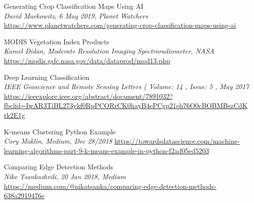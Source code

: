 \documentclass[12pt, openany]{report}
\begin{document}
\begin{thebibliography}{9}
Generating Crop Classification Maps Using AI\\
\textit{David Markowitz, 6 May 2019, Planet Watchers}\\
\url{https://www.planetwatchers.com/generating-crop-classification-maps-using-ai}

MODIS Vegetation Index Products\\
\textit{Kamel Didan, Moderate Resolution Imaging Spectroradiometer, NASA}\\
\url{https://modis.gsfc.nasa.gov/data/dataprod/mod13.php}

Deep Learning Classification\\
\textit{ IEEE Geoscience and Remote Sensing Letters ( Volume: 14 , Issue: 5 , May 2017 }\\
\url{https://ieeexplore.ieee.org/abstract/document/7891032?fbclid=IwAR3TiBL273ykf0RpPCORrCK0hayB4ePCgp21eh76O0cBOBMBszCdKtk2E1g}

K-means Clustering Python Example\\
\textit{Cory Maklin, Medium, Dec 28/2018}
\url{https://towardsdatascience.com/machine-learning-algorithms-part-9-k-means-example-in-python-f2ad05ed5203}

Comparing Edge Detection Methods\\
\textit{Nike Tsankashvili, 20 Jan 2018, Medium}\\
\url{https://medium.com/@nikatsanka/comparing-edge-detection-methods-638a2919476e}




\end{thebibliography}
\end{document}
